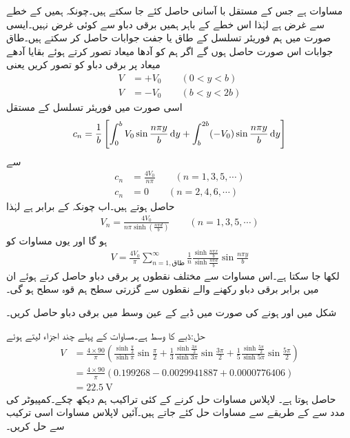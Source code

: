 مساوات   ہے جس کے مستقل با آسانی حاصل کئے جا سکتے ہیں۔چونکہ ہمیں  کے خطے سے غرض ہے لہٰذا اس خطے کے باہر ہمیں برقی دباو سے کوئی غرض نہیں۔ایسی صورت میں ہم فوریئر تسلسل کے طاق یا جفت جوابات حاصل کر سکتے ہیں۔طاق جوابات اس صورت حاصل ہوں گے اگر ہم  کو آدھا میعاد تصور کرتے ہوئے بقایا آدھے میعاد  پر برقی دباو کو  تصور کریں یعنی  
\begin{align*}
V&=+V_0 \quad \quad (0<y<b)\\
V&=-V_0 \quad \quad (b<y<2b)
\end{align*}
اسی صورت میں فوریئر تسلسل کے مستقل
\begin{align*}
c_n=\frac{1}{b}\left[\int_{0}^{b} V_0 \sin \frac{n\pi y}{b} \dif y +\int_{b}^{2b} (-V_0) \sin \frac{n\pi y}{b} \dif y \right]
\end{align*}
سے
\begin{align*}
c_n&=\frac{4V_0}{n\pi} \quad \quad (n=1,3,5,\cdots)\\
c_n&=0 \quad \quad (n=2,4,6,\cdots)
\end{align*}
حاصل ہوتے ہیں۔اب چونکہ  کے برابر ہے لہٰذا
\begin{align*}
V_n=\frac{4V_0}{n \pi \sinh (\tfrac{n \pi d}{b})}  \quad \quad (n=1,3,5,\cdots)
\end{align*}
ہو گا اور یوں مساوات  کو
\begin{align}\label{مساوات_لاپلاس_طاقتی_تسلسل_مساوات}
V=\frac{4V_0}{\pi} \sum_{n=1,\textrm{طاق}}^{\infty} \frac{1}{n} \frac{\sinh \frac{n\pi x}{b}}{\sinh \tfrac{n\pi d}{b}} \sin \frac{n\pi y}{b}
\end{align}
لکھا جا سکتا ہے۔اس مساوات سے مختلف نقطوں پر برقی دباو  حاصل کرتے ہوئے  ان میں برابر برقی دباو رکھنے والے نقطوں سے گزرتی سطح ہم قوہ سطح ہو گی۔

شکل  میں  اور  ہونے کی صورت میں ڈبے کے عین وسط میں برقی دباو حاصل کریں۔

حل:ڈبے کا وسط  ہے۔مساوات  کے پہلے چند اجزاء لیتے ہوئے
\begin{align*}
V&=\frac{4\times 90}{\pi} \left( \frac{\sinh \frac{\pi}{2}}{\sinh \pi} \sin \frac{\pi}{2}+\frac{1}{3}  \frac{\sinh \frac{3\pi}{2}}{\sinh 3\pi} \sin \frac{3\pi}{2}+\frac{1}{5}  \frac{\sinh \frac{5\pi}{2}}{\sinh 5\pi} \sin \frac{5\pi}{2}\right)\\
&=\frac{4\times 90}{\pi} \left(0.199268-0.0029941887+0.0000776406 \right)\\
&=\SI{22.5}{\volt}
\end{align*}
حاصل ہوتا ہے۔
لاپلاس مساوات حل کرنے کے کئی تراکیب ہم دیکھ چکے۔کمپیوٹر کی مدد سے  کے طریقے سے مساوات حل کئے جاتے ہیں۔آئیں لاپلاس مساوات اسی ترکیب سے حل کریں۔
  
